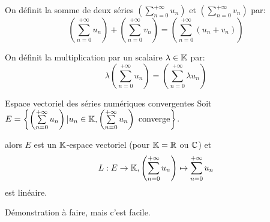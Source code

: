 \documentclass[a4paper, 12pt]{article}
\begin{document}
\begin{definition}
    On définit la somme de deux séries $(\sum\limits_{n=0}^{+\infty} u_n)$ et $(\sum\limits_{n=0}^{+\infty} v_n)$ par:
    $$
    \left(\sum\limits_{n=0}^{+\infty} u_n\right) + \left(\sum\limits_{n=0}^{+\infty} v_n\right) = \left(\sum\limits_{n=0}^{+\infty} (u_n + v_n)\right)
    $$

    On définit la multiplication par un scalaire $\lambda \in \mathbb{K}$ par:
    $$
    \lambda \left(\sum\limits_{n=0}^{+\infty} u_n\right) = \left(\sum\limits_{n=0}^{+\infty} \lambda u_n\right)
    $$
\end{definition}

\begin{proposition}{Espace vectoriel des séries numériques convergentes}{}
    Soit $E = \left\{ \left(\sum\limits_{n=0}^{+\infty} u_n\right) | u_n \in \mathbb{K}, \left(\sum\limits_{n=0}^{+\infty} u_n\right) \text{ converge} \right\}$.

    alors $E$ est un $\mathbb{K}$-espace vectoriel (pour $\mathbb{K} = \mathbb{R}$ ou $\mathbb{C}$) et
    $$
    L: E \rightarrow \mathbb{K}, \left(\sum\limits_{n=0}^{+\infty} u_n\right) \mapsto \sum\limits_{n=0}^{+\infty} u_n
    $$
    est linéaire.
\end{proposition}

\begin{hotwarn}
    Démonstration à faire, mais c'est facile.
\end{hotwarn}
\end{document}
